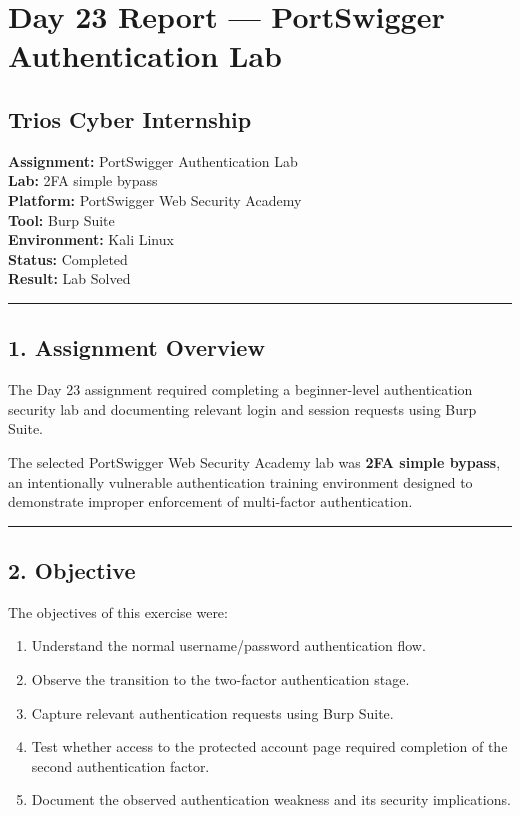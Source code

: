 \documentclass[
]{article}
\author{}
\date{}
\providecommand{\tightlist}{%
  \setlength{\itemsep}{0pt}\setlength{\parskip}{0pt}}
\begin{document}
\section{Day 23 Report --- PortSwigger Authentication
Lab}\label{day-23-report-portswigger-authentication-lab}

\subsection{Trios Cyber Internship}\label{trios-cyber-internship}

\textbf{Assignment:} PortSwigger Authentication Lab\\
\textbf{Lab:} 2FA simple bypass\\
\textbf{Platform:} PortSwigger Web Security Academy\\
\textbf{Tool:} Burp Suite\\
\textbf{Environment:} Kali Linux\\
\textbf{Status:} Completed\\
\textbf{Result:} Lab Solved

\begin{center}\rule{0.5\linewidth}{0.5pt}\end{center}

\subsection{1. Assignment Overview}\label{assignment-overview}

The Day 23 assignment required completing a beginner-level
authentication security lab and documenting relevant login and session
requests using Burp Suite.

The selected PortSwigger Web Security Academy lab was \textbf{2FA simple
bypass}, an intentionally vulnerable authentication training environment
designed to demonstrate improper enforcement of multi-factor
authentication.

\begin{center}\rule{0.5\linewidth}{0.5pt}\end{center}

\subsection{2. Objective}\label{objective}

The objectives of this exercise were:

\begin{enumerate}
\def\labelenumi{\arabic{enumi}.}
\tightlist
\item
  Understand the normal username/password authentication flow.
\item
  Observe the transition to the two-factor authentication stage.
\item
  Capture relevant authentication requests using Burp Suite.
\item
  Test whether access to the protected account page required completion
  of the second authentication factor.
\item
  Document the observed authentication weakness and its security
  implications.
\end{enumerate}
\end{document}
